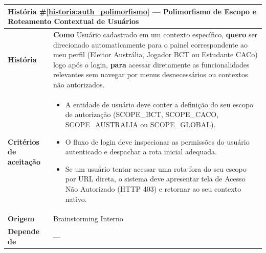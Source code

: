 \documentclass[12pt,a4paper]{article}
\newcounter{epico}
\newcounter{historia}
\begin{document}
\label{historia:auth_polimorfismo}
\begin{table}[H]
    \centering
    \begin{tabular}{|m{4.5cm} | m{11cm}|}
    \hline
    
    \multicolumn{2}{|l|}{\textbf{História \#\ref{historia:auth_polimorfismo} --- Polimorfismo de Escopo e Roteamento Contextual de Usuários
}} \\
    
    \hline  \textbf{História} &
    \textbf{Como} Usuário cadastrado em um contexto específico, \newline
    \textbf{quero} ser direcionado automaticamente para o painel correspondente ao meu perfil (Eleitor Austrália, Jogador BCT ou Estudante CACo) logo após o login, \newline  
    \textbf{para} acessar diretamente as funcionalidades relevantes sem navegar por menus desnecessários ou contextos não autorizados. \\
    
    \textbf{Critérios de aceitação} &
    \begin{itemize}
        \item{A entidade de usuário deve conter a definição do seu escopo de autorização (SCOPE\_BCT, SCOPE\_CACO, SCOPE\_AUSTRALIA ou SCOPE\_GLOBAL).}
        \item{O fluxo de login deve inspecionar as permissões do usuário autenticado e despachar a rota inicial adequada.}
        \item{Se um usuário tentar acessar uma rota fora do seu escopo por URL direta, o sistema deve apresentar tela de Acesso Não Autorizado (HTTP 403) e retornar ao seu contexto nativo.}
    \end{itemize}\\
    
    \textbf{Origem} &
    Brainstorming Interno \\
    
    \textbf{Depende de} &
    --- \\
    
    \hline
    \end{tabular}
\end{table}

\vspace{0.5cm}

\label{epico:interface_web}
\end{document}
